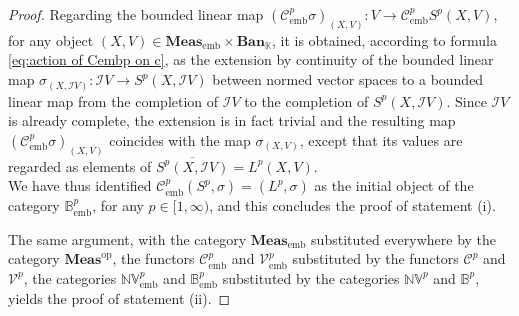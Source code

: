 \documentclass{amsart}
\theoremstyle{definition}
\theoremstyle{plain}
\newcommand{\opMeas}{\mathbf{Meas}^\mathrm{op}}
\newcommand{\embMeas}{\mathbf{Meas}_\mathrm{emb}}
\newcommand{\NVembp}{\mathbb{NV}_{\mathrm{emb}}^p}
\newcommand{\NVp}{\mathbb{NV}^p}
\newcommand{\Ban}{\mathbf{Ban}_{\mathbb{K}}}
\newcommand{\Bembp}{\mathbb{B}_{\mathrm{emb}}^p}
\newcommand{\Bp}{\mathbb{B}^p}
\begin{document}
\begin{proof}
            Regarding the bounded linear map $\left( \mathcal{C}_{\mathrm{emb}}^p \sigma \right)_{(X,V)} \colon V \rightarrow \mathcal{C}_{\mathrm{emb}}^p S^p(X,V)$, for any object $(X,V) \in \embMeas \times \Ban$, it is obtained, according to formula \eqref{eq:action of Cembp on c}, as the extension by continuity of the bounded linear map $\sigma_{(X,\mathcal{I}V)} \colon \mathcal{I}V \rightarrow S^p(X,\mathcal{I}V)$ between normed vector spaces to a bounded linear map from the completion of $\mathcal{I}V$ to the completion of $S^p(X,\mathcal{I}V)$.
            Since $\mathcal{I}V$ is already complete, the extension is in fact trivial and the resulting map $\left( \mathcal{C}_{\mathrm{emb}}^p \sigma \right)_{(X,V)}$ coincides with the map $\sigma_{(X,V)}$, except that its values are regarded as elements of $\overline{S^p(X,\mathcal{I}V)} = L^p(X,V)$. \\
            We have thus identified $\mathcal{C}_{\mathrm{emb}}^p(S^p,\sigma) = (L^p,\sigma)$ as the initial object of the category $\Bembp$, for any $p \in [1,\infty)$, and this concludes the proof of statement (i).
            
            The same argument, with the category $\embMeas$ substituted everywhere by the category $\opMeas$, the functors $\mathcal{C}_{\mathrm{emb}}^p$ and $\mathcal{V}_{\mathrm{emb}}^p$ substituted by the functors $\mathcal{C}^p$ and $\mathcal{V}^p$, the categories $\NVembp$ and $\Bembp$ substituted by the categories $\NVp$ and $\Bp$, yields the proof of statement (ii). 
        \end{proof}
\end{document}
